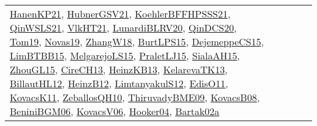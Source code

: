 {\begin{longtable}{lp{3cm}>{\raggedright}p{6cm}>{\raggedright}p{6cm}p{8cm}}
\href{papers/HanenKP21.pdf}{HanenKP21}\cite{HanenKP21}, \href{articles/HubnerGSV21.pdf}{HubnerGSV21}\cite{HubnerGSV21}, \href{articles/KoehlerBFFHPSSS21.pdf}{KoehlerBFFHPSSS21}\cite{KoehlerBFFHPSSS21}, \href{articles/QinWSLS21.pdf}{QinWSLS21}\cite{QinWSLS21}, \href{articles/VlkHT21.pdf}{VlkHT21}\cite{VlkHT21}, \href{articles/LunardiBLRV20.pdf}{LunardiBLRV20}\cite{LunardiBLRV20}, \href{articles/QinDCS20.pdf}{QinDCS20}\cite{QinDCS20}, \href{papers/Tom19.pdf}{Tom19}\cite{Tom19}, \href{articles/Novas19.pdf}{Novas19}\cite{Novas19}, \href{articles/ZhangW18.pdf}{ZhangW18}\cite{ZhangW18}, \href{papers/BurtLPS15.pdf}{BurtLPS15}\cite{BurtLPS15}, \href{papers/DejemeppeCS15.pdf}{DejemeppeCS15}\cite{DejemeppeCS15}, \href{papers/LimBTBB15.pdf}{LimBTBB15}\cite{LimBTBB15}, \href{papers/MelgarejoLS15.pdf}{MelgarejoLS15}\cite{MelgarejoLS15}, \href{papers/PraletLJ15.pdf}{PraletLJ15}\cite{PraletLJ15}, \href{papers/SialaAH15.pdf}{SialaAH15}\cite{SialaAH15}, \href{papers/ZhouGL15.pdf}{ZhouGL15}\cite{ZhouGL15}, \href{papers/CireCH13.pdf}{CireCH13}\cite{CireCH13}, \href{papers/HeinzKB13.pdf}{HeinzKB13}\cite{HeinzKB13}, \href{papers/KelarevaTK13.pdf}{KelarevaTK13}\cite{KelarevaTK13}, \href{papers/BillautHL12.pdf}{BillautHL12}\cite{BillautHL12}, \href{papers/HeinzB12.pdf}{HeinzB12}\cite{HeinzB12}, \href{articles/LimtanyakulS12.pdf}{LimtanyakulS12}\cite{LimtanyakulS12}, \href{papers/EdisO11.pdf}{EdisO11}\cite{EdisO11}, \href{articles/KovacsK11.pdf}{KovacsK11}\cite{KovacsK11}, \href{articles/ZeballosQH10.pdf}{ZeballosQH10}\cite{ZeballosQH10}, \href{papers/ThiruvadyBME09.pdf}{ThiruvadyBME09}\cite{ThiruvadyBME09}, \href{articles/KovacsB08.pdf}{KovacsB08}\cite{KovacsB08}, \href{papers/BeniniBGM06.pdf}{BeniniBGM06}\cite{BeniniBGM06}, \href{papers/KovacsV06.pdf}{KovacsV06}\cite{KovacsV06}, \href{papers/Hooker04.pdf}{Hooker04}\cite{Hooker04}, \href{papers/Bartak02a.pdf}{Bartak02a}\cite{Bartak02a}\\

\end{longtable}}

